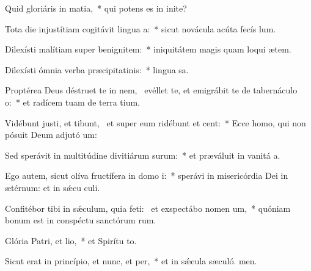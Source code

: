 \item Quid gloriáris in matia,~* qui potens es in inite?
\item Tota die injustítiam cogitávit lingua a:~* sicut novácula acúta fecís lum.
\item Dilexísti malítiam super benignitem:~* iniquitátem magis quam loqui ætem.
\item Dilexísti ómnia verba præcipitatinis:~* lingua sa.
\item Proptérea Deus déstruet te in nem,~\pscross{} evéllet te, et emigrábit te de tabernáculo o:~* et radícem tuam de terra tium.
\item Vidébunt justi, et tibunt,~\pscross{} et super eum ridébunt et cent:~* Ecce homo, qui non pósuit Deum adjutó um:
\item Sed sperávit in multitúdine divitiárum surum:~* et præváluit in vanitá a.
\item Ego autem, sicut olíva fructífera in domo i:~* sperávi in misericórdia Dei in ætérnum: et in sǽcu culi.
\item Confitébor tibi in sǽculum, quia feti:~\pscross{} et exspectábo nomen um,~* quóniam bonum est in conspéctu sanctórum rum.
\item Glória Patri, et lio,~* et Spirítu to.
\item Sicut erat in princípio, et nunc, et per,~* et in sǽcula sæculó. men.
